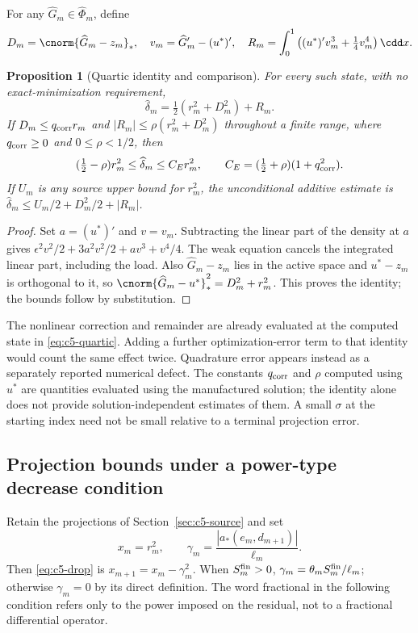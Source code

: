 \documentclass[11pt]{article}
\newtheorem{proposition}[theorem]{Proposition}
\theoremstyle{remark}
\begin{document}
For any $\widehat G_m\in\widehat\Phi_m$, define
\[
 D_m=\cnorm{\widehat G_m-z_m}_*,\quad
 v_m=\widehat G_m'-(u^*)',\quad
 R_m=\int_0^1\left((u^*)'v_m^3+\tfrac14v_m^4\right)\cdd x .
\]
\begin{proposition}[Quartic identity and comparison]
\label{prop:c5-quartic}
For every such state, with no exact-minimization requirement,
\begin{equation}
 \widehat\delta_m=\tfrac12(r_m^2+D_m^2)+R_m.
 \label{eq:c5-quartic}
\end{equation}
If $D_m\leq q_{\rm corr}r_m$ and
$|R_m|\leq\rho(r_m^2+D_m^2)$ throughout a finite range, where
$q_{\rm corr}\geq0$ and $0\leq\rho<1/2$, then
\begin{equation}
 (\tfrac12-\rho)r_m^2\leq\widehat\delta_m
 \leq C_Er_m^2,\qquad C_E=(\tfrac12+\rho)(1+q_{\rm corr}^2).
 \label{eq:c5-quartic-comparison}
\end{equation}
If $U_m$ is any source upper bound for $r_m^2$, the unconditional
additive estimate is
$\widehat\delta_m\leq U_m/2+D_m^2/2+|R_m|$.
\end{proposition}
\begin{proof}
Set $a=(u^*)'$ and $v=v_m$. Subtracting the linear part of the density
at $a$ gives
$\epsilon^2v^2/2+3a^2v^2/2+av^3+v^4/4$.
The weak equation cancels the integrated linear part, including the load.
Also $\widehat G_m-z_m$ lies in the active space and
$u^*-z_m$ is orthogonal to it, so
$\cnorm{\widehat G_m-u^*}_*^2=D_m^2+r_m^2$.
This proves the identity; the bounds follow by substitution.
\end{proof}

The nonlinear correction and remainder are already evaluated at the computed
state in \eqref{eq:c5-quartic}. Adding a further optimization-error term
to that identity would count the same effect twice.
Quadrature error appears instead as a separately reported numerical defect.
The constants $q_{\rm corr}$ and $\rho$ computed using $u^*$ are
quantities evaluated using the manufactured solution; the identity alone does not provide
solution-independent estimates of them. A small $\sigma$ at the starting index need
not be small relative to a terminal projection error.

\subsection{Projection bounds under a power-type decrease condition}
\label{sec:c5-power}

Retain the projections of Section~\ref{sec:c5-source} and set
\[
 x_m=r_m^2,\qquad
 \gamma_m=\frac{|a_*(e_m,d_{m+1})|}{\ell_m}.
\]
Then \eqref{eq:c5-drop} is $x_{m+1}=x_m-\gamma_m^2$.
When $S_m^{\rm fin}>0$, $\gamma_m=\theta_mS_m^{\rm fin}/\ell_m$;
otherwise $\gamma_m=0$ by its direct definition.
The word fractional in the following condition refers only to the power
imposed on the residual, not to a fractional differential operator.
\end{document}
